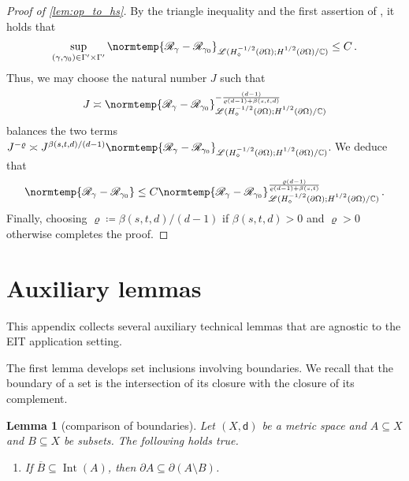 \documentclass[pdflatex,sn-mathphys-num]{sn-jnl-preprint}
\newcommand{\C}{\mathbb{C}}
\newcommand{\sL}{\mathscr{L}}
\newcommand{\sR}{\mathscr{R}}
\newcommand{\pOmega}{{\partial\Omega}}
\newcommand{\ntd}{\mathscr{R}_{\gamma}}
\newcommand{\ntdz}{\mathscr{R}_{\gamma_0}}
\newcommand{\norm}{\normtemp}
\newcommand{\defeq}{\coloneqq} %
\DeclareMathOperator{\Int}{Int} %
\theoremstyle{thmstyleone}%
\newtheorem{lemma}[theorem]{Lemma}%
\theoremstyle{thmstyletwo}%
\theoremstyle{thmstylethree}%
\numberwithin{equation}{section}
\numberwithin{theorem}{section}
\begin{document}
\begin{appendices}
\begin{proof}[Proof of \cref{lem:op_to_hs}]
    By the triangle inequality and the first assertion of , it holds that 
    \begin{align*}
    \sup_{(\gamma,\gamma_0)\in\Gamma'\times\Gamma'}\norm{\ntd -\ntdz}_{\sL(H^{-1/2}_\diamond(\pOmega);H_{\phantom{\diamond}}^{1/2}(\pOmega)/\C)}\leq C\,.
    \end{align*}
    Thus, we may choose the natural number $J$ such that
	\begin{align*}
		J \asymp \norm{\ntd -\ntdz}_{\sL(H^{-1/2}_\diamond(\pOmega);H_{\phantom{\diamond}}^{1/2}(\pOmega)/\C)}^{-\frac{(d-1)}{\varrho(d-1) + \beta(s,t,d)}}
	\end{align*}
	balances the two terms $J^{-\varrho} \asymp J^{\beta(s,t,d)/(d-1)}\norm{\ntd -\ntdz}_{\sL(H^{-1/2}_\diamond(\pOmega);H_{\phantom{\diamond}}^{1/2}(\pOmega)/\C)}$. We deduce that
	\begin{align*}
		\norm{\ntd-\sR_{\gamma_0}}\leq C \norm{\ntd -\ntdz}_{\sL(H^{-1/2}_\diamond(\pOmega);H_{\phantom{\diamond}}^{1/2}(\pOmega)/\C)}^{\frac{\varrho(d-1)}{\varrho(d-1) + \beta(s,t)}}\,.
	\end{align*}
	Finally, choosing $\varrho\defeq \beta(s,t,d)/(d-1)$ if $\beta(s,t,d)>0$ and $\varrho>0$ otherwise completes the proof.
\end{proof}


\section{Auxiliary lemmas}\label{app:lemmas}
This appendix collects several auxiliary technical lemmas that are agnostic to the EIT application setting.

The first lemma develops set inclusions involving boundaries. We recall that the boundary of a set is the intersection of its closure with the closure of its complement.
\begin{lemma}[comparison of boundaries]\label{lem:app_boundary}
	Let $(X, \mathsf{d})$ be a metric space and $A\subseteq X$ and $B\subseteq X$ be subsets. The following holds true.
	\begin{enumerate}[label=(\roman*)]
		\item If $\overline{B}\subseteq \Int(A)$, then $\partial A\subseteq \partial(A\setminus B)$.\label{item:lem_bdry1}
		

\end{enumerate}
\end{lemma}
\end{appendices}
\end{document}
